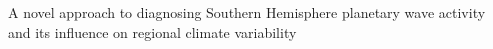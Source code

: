 A novel approach to diagnosing Southern Hemisphere planetary wave activity and its influence on regional climate variability
    